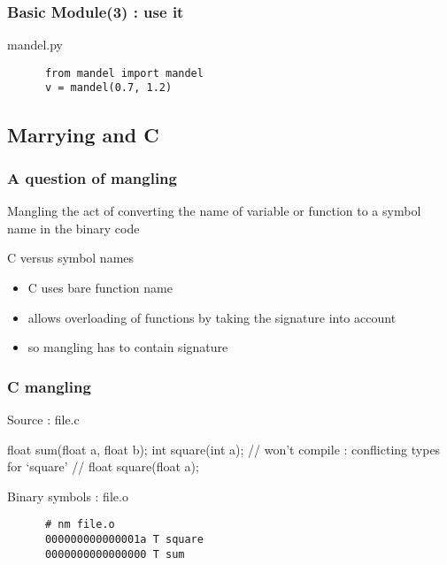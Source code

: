 \begin{frame}[fragile]
  \frametitle{Basic Module(3) : use it}
  \begin{block}{mandel.py}
    \begin{verbatim}
      from mandel import mandel
      v = mandel(0.7, 1.2)
    \end{verbatim}
  \end{block}
\end{frame}


\subsection[C]{Marrying \cpp and C}

\begin{frame}[fragile]
  \frametitle{A question of mangling}
  \begin{block}{Mangling}
    the act of converting the name of variable or function to a symbol name in the binary code
  \end{block}
  \begin{block}{C versus \cpp symbol names}
    \begin{itemize}
    \item C uses bare function name
    \item \cpp allows overloading of functions by taking the signature into account
    \item so \cpp mangling has to contain signature
    \end{itemize}
  \end{block}
\end{frame}

\begin{frame}[fragile]
  \frametitle{C mangling}
  \begin{exampleblock}{Source : file.c}
    \begin{cppcode*}{}
      float sum(float a, float b);
      int square(int a);
      // won't compile : conflicting types for ‘square’
      // float square(float a);
    \end{cppcode*}
  \end{exampleblock}
  \begin{block}{Binary symbols : file.o}
    \begin{verbatim}
      # nm file.o
      000000000000001a T square
      0000000000000000 T sum
    \end{verbatim}
  \end{block}  
\end{frame}

